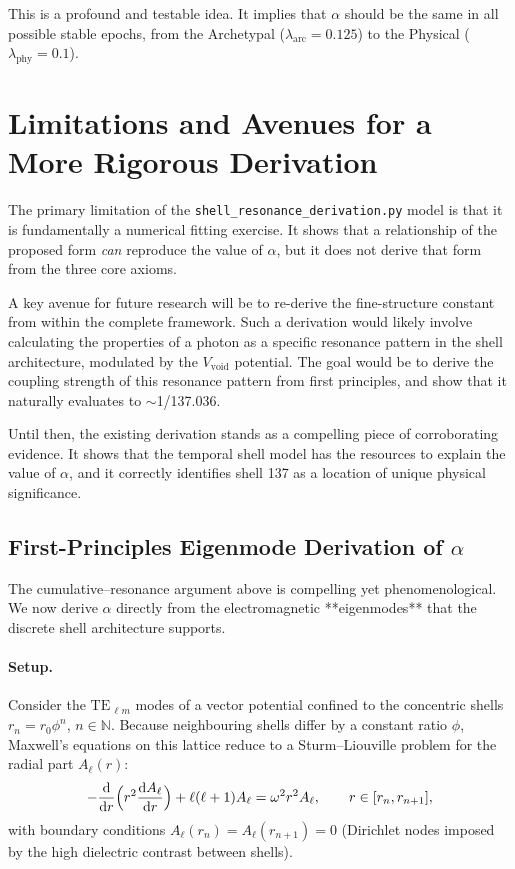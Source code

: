 \documentclass[12pt]{report}
\newcommand{\dd}{\mathrm{d}}
\begin{document}
This is a profound and testable idea. It implies that $\alpha$ should be the same in all possible stable epochs, from the Archetypal ($\lambda_{\text{arc}}=0.125$) to the Physical ($\lambda_{\text{phy}}=0.1$).

\section{Limitations and Avenues for a More Rigorous Derivation}
The primary limitation of the \texttt{shell\_resonance\_derivation.py} model is that it is fundamentally a numerical fitting exercise. It shows that a relationship of the proposed form \textit{can} reproduce the value of $\alpha$, but it does not derive that form from the three core axioms.

A key avenue for future research will be to re-derive the fine-structure constant from within the complete framework. Such a derivation would likely involve calculating the properties of a photon as a specific resonance pattern in the shell architecture, modulated by the $V_{\text{void}}$ potential. The goal would be to derive the coupling strength of this resonance pattern from first principles, and show that it naturally evaluates to $\sim$1/137.036.

Until then, the existing derivation stands as a compelling piece of corroborating evidence. It shows that the temporal shell model has the resources to explain the value of $\alpha$, and it correctly identifies shell 137 as a location of unique physical significance.

\subsection{First-Principles Eigenmode Derivation of \texorpdfstring{$\alpha$}{α}}\label{subsec:alpha_eigen}
The cumulative–resonance argument above is compelling yet phenomenological.  We now derive $\alpha$ directly from the electromagnetic **eigenmodes** that the discrete shell architecture supports.

\paragraph{Setup.}  Consider the $\mathrm{TE}_{\, \ell m}$ modes of a vector potential confined to the concentric shells $r_n=r_0\phi^{n}$, $n\in\mathbb N$.  Because neighbouring shells differ by a constant ratio $\phi$, Maxwell's equations on this lattice reduce to a Sturm–Liouville problem for the radial part $A_\ell(r)$:
\begin{equation}\label{eq:eigen_eq}
    -\frac{\dd}{\dd r}\Bigl(r^2\frac{\dd A_\ell}{\dd r}\Bigr)+\ell(\ell+1)A_\ell = \omega^2 r^2 A_\ell,\qquad r\in[r_n, r_{n+1}],
\end{equation}
with boundary conditions $A_\ell(r_n)=A_\ell(r_{n+1})=0$ (Dirichlet nodes imposed by the high dielectric contrast between shells).
\end{document}
